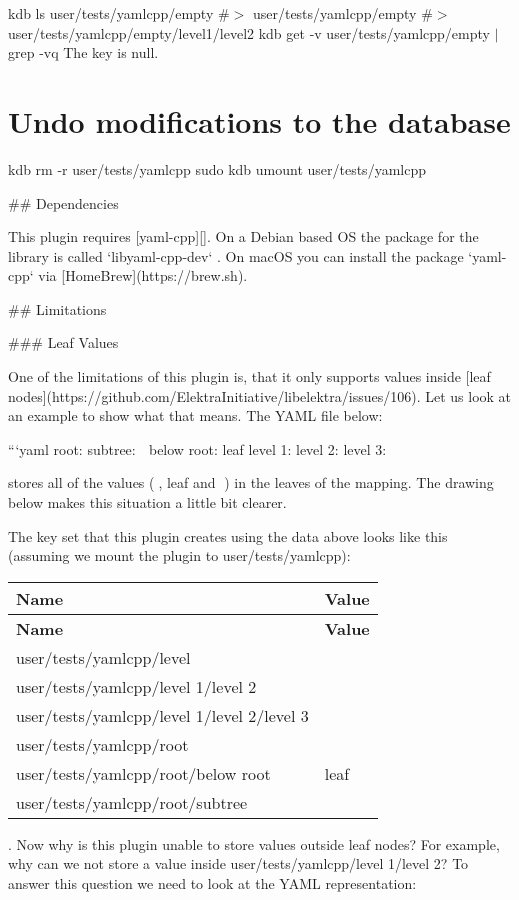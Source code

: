 kdb ls user/tests/yamlcpp/empty \#$>$ user/tests/yamlcpp/empty \#$>$ user/tests/yamlcpp/empty/level1/level2 kdb get -\/v user/tests/yamlcpp/empty $\vert$ grep -\/vq \textquotesingle{}The key is null.\textquotesingle{}

\section*{Undo modifications to the database}

kdb rm -\/r user/tests/yamlcpp sudo kdb umount user/tests/yamlcpp 
\begin{DoxyCode}
## Dependencies

This plugin requires [yaml-cpp][]. On a Debian based OS the package for the library is called
       `libyaml-cpp-dev` . On macOS you can install the package `yaml-cpp` via [HomeBrew](https://brew.sh).

## Limitations

### Leaf Values

One of the limitations of this plugin is, that it only supports values inside [leaf
       nodes](https://github.com/ElektraInitiative/libelektra/issues/106). Let us look at an example to show what that means. The YAML
       file below:

```yaml
root:
  subtree: 🍂
  below root: leaf
level 1:
  level 2:
    level 3: 🍁
\end{DoxyCode}


stores all of the values ({\ttfamily 🍂}, {\ttfamily leaf} and {\ttfamily 🍁}) in the leaves of the mapping. The drawing below makes this situation a little bit clearer.



The key set that this plugin creates using the data above looks like this (assuming we mount the plugin to {\ttfamily user/tests/yamlcpp})\+:

\tabulinesep=1mm
\begin{longtabu} spread 0pt [c]{*{2}{|X[-1]}|}
\hline
\rowcolor{\tableheadbgcolor}\textbf{ Name }&\textbf{ Value  }\\
\endfirsthead
\hline
\endfoot
\hline
\rowcolor{\tableheadbgcolor}\textbf{ Name }&\textbf{ Value  }\\
\endhead
user/tests/yamlcpp/level &\\
user/tests/yamlcpp/level 1/level 2 &\\
user/tests/yamlcpp/level 1/level 2/level 3 &🍁 \\
user/tests/yamlcpp/root &\\
user/tests/yamlcpp/root/below root &leaf \\
user/tests/yamlcpp/root/subtree &🍂 \\
\end{longtabu}
. Now why is this plugin unable to store values outside leaf nodes? For example, why can we not store a value inside {\ttfamily user/tests/yamlcpp/level 1/level 2}? To answer this question we need to look at the Y\+A\+ML representation\+:


